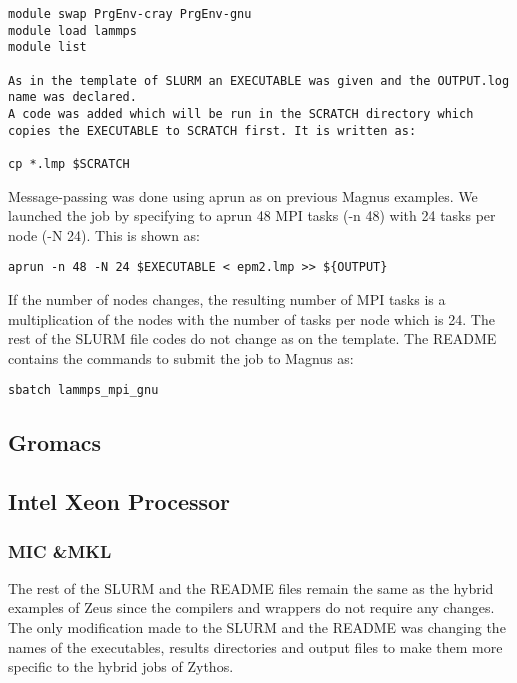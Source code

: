 \documentclass[journal]{IEEEtran}
\begin{document}
\begin{verbatim}
module swap PrgEnv-cray PrgEnv-gnu
module load lammps
module list

As in the template of SLURM an EXECUTABLE was given and the OUTPUT.log name was declared.
A code was added which will be run in the SCRATCH directory which copies the EXECUTABLE to SCRATCH first. It is written as:

cp *.lmp $SCRATCH
\end{verbatim}


Message-passing was done using aprun as on previous Magnus examples.
We launched the job by specifying to aprun 48 MPI tasks (-n 48) with 24 tasks per node (-N 24).
This is shown as:

\begin{verbatim}
aprun -n 48 -N 24 $EXECUTABLE < epm2.lmp >> ${OUTPUT}
\end{verbatim}
 
If the number of nodes changes, the resulting number of  MPI tasks is a multiplication of the nodes with the number of tasks per node which is 24.
The rest of the SLURM file codes do not change as on the template.
The README contains the commands to submit the job to Magnus as:

\begin{verbatim}
sbatch lammps_mpi_gnu
\end{verbatim}

\subsection{Gromacs}





\subsection{Intel Xeon Processor}

\subsubsection{MIC &MKL}  

The rest of the SLURM and the README files remain the same as the hybrid examples of Zeus since the compilers and wrappers do not require any changes.
The only modification made to the SLURM and the README was changing the names of the executables, results directories and output files to make them more
specific to the hybrid jobs of Zythos. 
\end{document}

